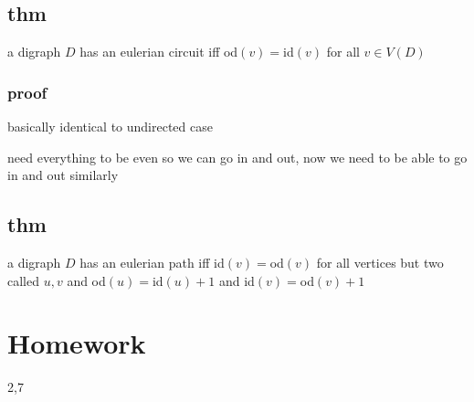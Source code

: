 \documentclass[letterpaper]{article}
\begin{document}
\subsection*{thm}
a digraph $D$ has an eulerian circuit iff od$(v)=$id$(v)$ for all $v\in V(D)$
\subsubsection*{proof}
basically identical to undirected case

need everything to be even so we can go in and out, now we need to be able to go in and out similarly

\subsection*{thm}
a digraph $D$ has an eulerian path iff id$(v)=$od$(v)$ for all vertices but two called $u,v$ and od$(u)=$id$(u)+1$ and id$(v)=$od$(v)+1$
\section*{Homework}
2,7
\end{document}
